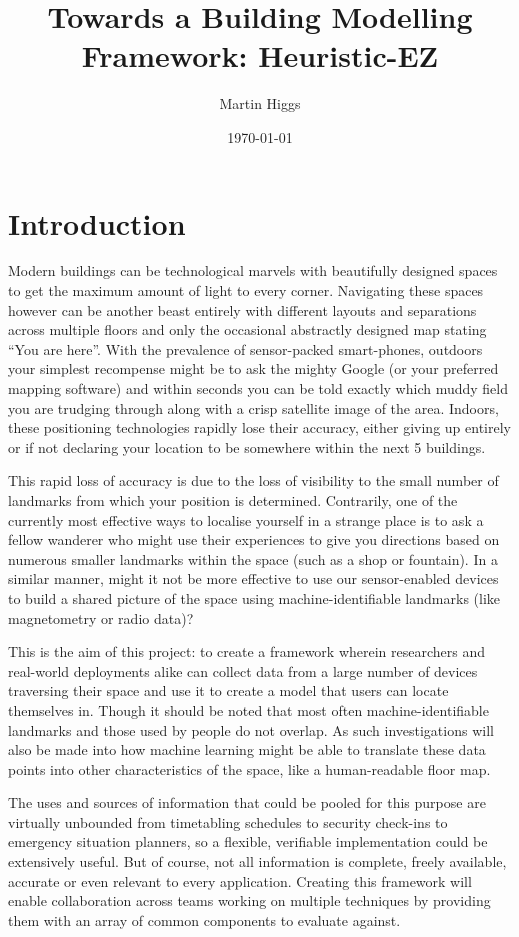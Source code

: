 \documentclass{UoYCSproject}
\title{Towards a Building Modelling Framework: Heuristic-EZ}
\author{Martin Higgs}
\date{\today}
\begin{document}
	
	\maketitle
	
	\chapter{Introduction}
    \label{chap:intro}
    
        Modern buildings can be technological marvels with beautifully designed spaces to get the maximum amount of light to every corner. Navigating these spaces however can be another beast entirely with different layouts and separations across multiple floors and only the occasional abstractly designed map stating ``You are here''. With the prevalence of sensor-packed smart-phones, outdoors your simplest recompense might be to ask the mighty Google (or your preferred mapping software) and within seconds you can be told exactly which muddy field you are trudging through along with a crisp satellite image of the area. Indoors, these positioning technologies rapidly lose their accuracy, either giving up entirely or if not declaring your location to be somewhere within the next 5 buildings.
        
        This rapid loss of accuracy is due to the loss of visibility to the small number of landmarks from which your position is determined. Contrarily, one of the currently most effective ways to localise yourself in a strange place is to ask a fellow wanderer who might use their experiences to give you directions based on numerous smaller landmarks within the space (such as a shop or fountain). In a similar manner, might it not be more effective to use our sensor-enabled devices to build a shared picture of the space using machine-identifiable landmarks (like magnetometry or radio data)?
        
        This is the aim of this project: to create a framework wherein researchers and real-world deployments alike can collect data from a large number of devices traversing their space and use it to create a model that users can locate themselves in. Though it should be noted that most often machine-identifiable landmarks and those used by people do not overlap. As such investigations will also be made into how machine learning might be able to translate these data points into other characteristics of the space, like a human-readable floor map. 
        
        The uses and sources of information that could be pooled for this purpose are virtually unbounded from timetabling schedules to security check-ins to emergency situation planners, so a flexible, verifiable implementation could be extensively useful. But of course, not all information is complete, freely available, accurate or even relevant to every application. Creating this framework will enable collaboration across teams working on multiple techniques by providing them with an array of common components to evaluate against.
        
\end{document}
